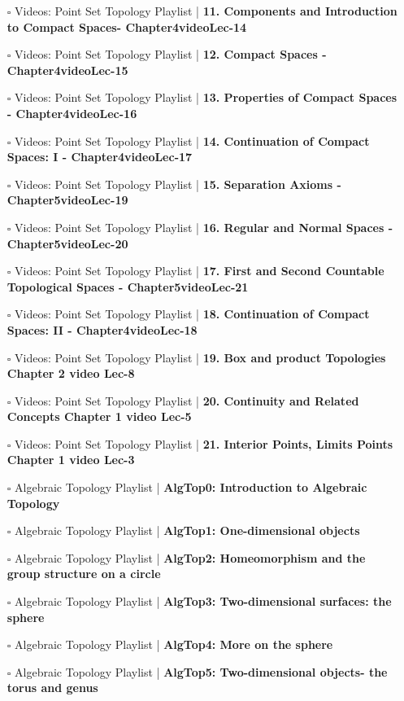 \documentclass[a4, landscape, 12pt]{article}
\newcommand{\checkbox}{$\square$}%
\begin{document}
\begin{itemize}
{}
\item [\checkbox] Videos: Point Set Topology Playlist  | \textbf{11. Components and Introduction to Compact Spaces- Chapter4videoLec-14
}
\item [\checkbox] Videos: Point Set Topology Playlist  | \textbf{12. Compact Spaces - Chapter4videoLec-15
}
\item [\checkbox] Videos: Point Set Topology Playlist  | \textbf{13. Properties of Compact Spaces - Chapter4videoLec-16
}
\item [\checkbox] Videos: Point Set Topology Playlist  | \textbf{14. Continuation of Compact Spaces: I - Chapter4videoLec-17
}
\item [\checkbox] Videos: Point Set Topology Playlist  | \textbf{15. Separation Axioms - Chapter5videoLec-19
}
\item [\checkbox] Videos: Point Set Topology Playlist  | \textbf{16. Regular and Normal Spaces - Chapter5videoLec-20
}
\item [\checkbox] Videos: Point Set Topology Playlist  | \textbf{17. First and Second Countable Topological Spaces - Chapter5videoLec-21
}
\item [\checkbox] Videos: Point Set Topology Playlist  | \textbf{18. Continuation of Compact Spaces: II  - Chapter4videoLec-18
}
\item [\checkbox] Videos: Point Set Topology Playlist  | \textbf{19. Box and product Topologies  Chapter 2 video Lec-8
}
\item [\checkbox] Videos: Point Set Topology Playlist  | \textbf{20. Continuity and Related Concepts  Chapter 1 video Lec-5
}
\item [\checkbox] Videos: Point Set Topology Playlist  | \textbf{21. Interior Points, Limits Points  Chapter 1 video Lec-3
}
\item [\checkbox] Algebraic Topology Playlist  | \textbf{AlgTop0: Introduction to Algebraic Topology
}
\item [\checkbox] Algebraic Topology Playlist  | \textbf{AlgTop1: One-dimensional objects
}
\item [\checkbox] Algebraic Topology Playlist  | \textbf{AlgTop2: Homeomorphism and the group structure on a circle
}
\item [\checkbox] Algebraic Topology Playlist  | \textbf{AlgTop3: Two-dimensional surfaces: the sphere
}
\item [\checkbox] Algebraic Topology Playlist  | \textbf{AlgTop4: More on the sphere
}
\item [\checkbox] Algebraic Topology Playlist  | \textbf{AlgTop5: Two-dimensional objects- the torus and genus
}
\end{itemize}
\end{document}
